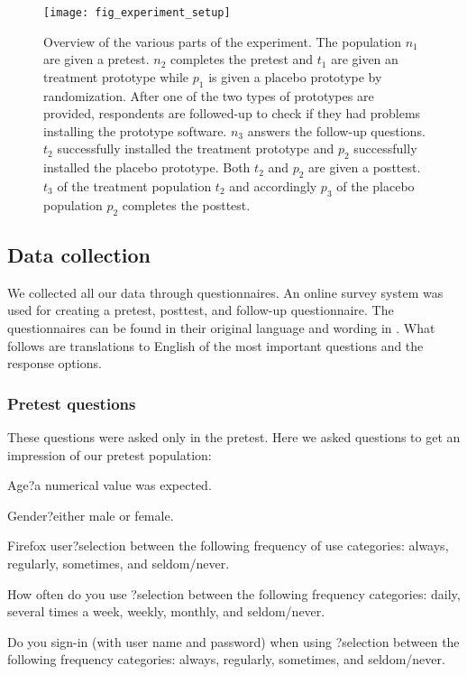 \begin{figure}
  \texttt{[image: fig\_experiment\_setup]}
  \caption[Experiment Overview]{
    Overview of the various parts of the experiment. The population $n_1$
    are given a pretest. $n_2$ completes the pretest and $t_1$ are given
    an treatment prototype while $p_1$ is given a placebo
    prototype by randomization.
    After one of the two types of prototypes are provided, respondents are
    followed-up to check if they had problems installing the prototype
    software. $n_3$ answers the follow-up questions.
    $t_2$ successfully installed the treatment prototype and $p_2$
    successfully installed the placebo prototype. Both $t_2$ and $p_2$ are
    given a posttest.
    $t_3$ of the treatment population $t_2$ and accordingly $p_3$ of the
    placebo population $p_2$ completes the posttest.
  }
  \label{figure:fig.experiment.setup}
\end{figure}

\subsection{Data collection}

We collected all our data through questionnaires. An online survey system was
used for creating a pretest, posttest, and follow-up questionnaire. The
questionnaires can be found in their original language and wording in
. What follows are translations to English
of the most important questions and the response options.

\subsubsection{Pretest questions}

These questions were asked only in the pretest. Here we asked questions to
get an impression of our pretest population:

\begin{items}
  \item Age{}?\dash{}a numerical value was expected.
  \item Gender{}?\dash{}either male or female.
  \item Firefox user{}?\dash{}selection between the following frequency of use
    categories: always, regularly, sometimes, and seldom/never.
  \item How often do you use \urort{}?\dash{}selection between the following
    frequency categories: daily, several times a week, weekly, monthly,
    and seldom/never.
  \item Do you sign-in (with user name and password) when using
    \urort{}?\dash{}selection between the following frequency
    categories: always, regularly, sometimes, and seldom/never.
\end{items}

